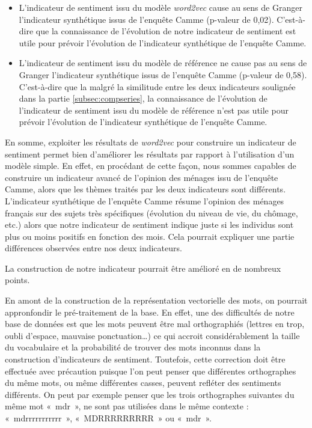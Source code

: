 \documentclass[11pt,french,french]{article}
\begin{document}
\begin{itemize}
\item
  L'indicateur de sentiment issu du modèle \emph{word2vec} cause au sens de Granger l'indicateur synthétique issus de l'enquête Camme (p-valeur de 0,02).
  C'est-à-dire que la connaissance de l'évolution de notre indicateur de sentiment est utile pour prévoir l'évolution de l'indicateur synthétique de l'enquête Camme.
\item
  L'indicateur de sentiment issu du modèle de référence ne cause pas au sens de Granger l'indicateur synthétique issus de l'enquête Camme (p-valeur de 0,58).
  C'est-à-dire que la malgré la similitude entre les deux indicateurs soulignée dans la partie \ref{subsec:compseries}, la connaissance de l'évolution de l'indicateur de sentiment issu du modèle de référence n'est pas utile pour prévoir l'évolution de l'indicateur synthétique de l'enquête Camme.
\end{itemize}

En somme, exploiter les résultats de \emph{word2vec} pour construire un indicateur de sentiment permet bien d'améliorer les résultats par rapport à l'utilisation d'un modèle simple.
En effet, en procédant de cette façon, nous sommes capables de construire un indicateur avancé de l'opinion des ménages issu de l'enquête Camme, alors que les thèmes traités par les deux indicateurs sont différents.
L'indicateur synthétique de l'enquête Camme résume l'opinion des ménages français sur des sujets très spécifiques (évolution du niveau de vie, du chômage, etc.) alors que notre indicateur de sentiment indique juste si les individus sont plus ou moins positifs en fonction des mois.
Cela pourrait expliquer une partie différences observées entre nos deux indicateurs.

La construction de notre indicateur pourrait être amélioré en de nombreux points.

En amont de la construction de la représentation vectorielle des mots, on pourrait appronfondir le pré-traitement de la base.
En effet, une des difficultés de notre base de données est que les mots peuvent être mal orthographiés (lettres en trop, oubli d'espace, mauvaise ponctuation\dots) ce qui accroit considérablement la taille du vocabulaire et la probabilité de trouver des mots inconnus dans la construction d'indicateurs de sentiment.
Toutefois, cette correction doit être effectuée avec précaution puisque l'on peut penser que différentes orthographes du même mots, ou même différentes casses, peuvent refléter des sentiments différents.
On peut par exemple penser que les trois orthographes suivantes du même mot «~mdr~», ne sont pas utilisées dans le même contexte : «~mdrrrrrrrrrrr~», «~MDRRRRRRRRR~» ou «~mdr~».
\end{document}
